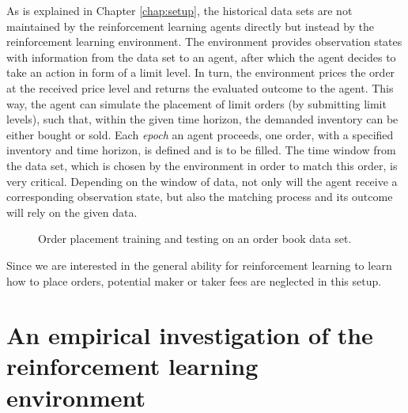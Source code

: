 As is explained in Chapter \ref{chap:setup}, the historical data sets are not maintained by the reinforcement learning agents directly but instead by the reinforcement learning environment.
The environment provides observation states with information from the data set to an agent, after which the agent decides to take an action in form of a limit level.
In turn, the environment prices the order at the received price level and returns the evaluated outcome to the agent.
This way, the agent can simulate the placement of limit orders (by submitting limit levels), such that, within the given time horizon, the demanded inventory can be either bought or sold.
Each \textit{epoch} an agent proceeds, one order, with a specified inventory and time horizon, is defined and is to be filled.
The time window from the data set, which is chosen by the environment in order to match this order, is very critical.
Depending on the window of data, not only will the agent receive a corresponding observation state, but also the matching process and its outcome will rely on the given data.

\begin{figure}[H]
    \centering
    \caption{Order placement training and testing on an order book data set.}
    \label{fig:eval-orderbook}
\end{figure}


Since we are interested in the general ability for reinforcement learning to learn how to place orders, potential maker or taker fees are neglected in this setup.


\section{An empirical investigation of the reinforcement learning environment}

